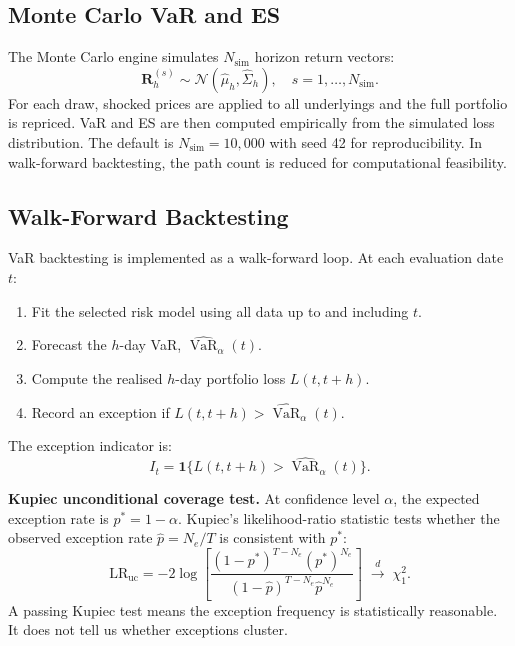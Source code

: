 \documentclass[11pt]{article}
\newcommand{\Norm}{\mathcal{N}}
\DeclareMathOperator{\VaR}{VaR}
\begin{document}
\subsection{Monte Carlo VaR and ES}
\label{sec:mc}

The Monte Carlo engine simulates $N_{\text{sim}}$ horizon return vectors:
\begin{equation}
  \mathbf{R}_h^{(s)} \sim \Norm\!\left(\hat{\mu}_h, \hat{\Sigma}_h\right),
  \quad s = 1,\ldots,N_{\text{sim}}.
  \label{eq:mc_draws}
\end{equation}
For each draw, shocked prices are applied to all underlyings and the full
portfolio is repriced.  VaR and ES are then computed empirically from the
simulated loss distribution.  The default is $N_{\text{sim}}=10{,}000$
with seed 42 for reproducibility.  In walk-forward backtesting, the path
count is reduced for computational feasibility.

\subsection{Walk-Forward Backtesting}
\label{sec:backtest-method}

VaR backtesting is implemented as a walk-forward loop.  At each evaluation
date $t$:
\begin{enumerate}
  \item Fit the selected risk model using all data up to and including $t$.
  \item Forecast the $h$-day VaR, $\widehat{\VaR}_\alpha(t)$.
  \item Compute the realised $h$-day portfolio loss $L(t,t+h)$.
  \item Record an exception if $L(t,t+h) > \widehat{\VaR}_\alpha(t)$.
\end{enumerate}

The exception indicator is:
\[
  I_t = \mathbf{1}\!\{L(t,t+h) > \widehat{\VaR}_\alpha(t)\}.
\]

\textbf{Kupiec unconditional coverage test.}  At confidence level
$\alpha$, the expected exception rate is $p^* = 1-\alpha$.  Kupiec's
likelihood-ratio statistic tests whether the observed exception rate
$\hat{p} = N_e/T$ is consistent with $p^*$:
\begin{equation}
  \mathrm{LR}_{\mathrm{uc}}
    = -2\log\!\left[\frac{(1-p^*)^{T-N_e}(p^*)^{N_e}}
                        {(1-\hat{p})^{T-N_e}\hat{p}^{N_e}}\right]
    \;\xrightarrow{d}\; \chi^2_1.
  \label{eq:kupiec}
\end{equation}
A passing Kupiec test means the exception frequency is statistically
reasonable.  It does not tell us whether exceptions cluster.
\end{document}
